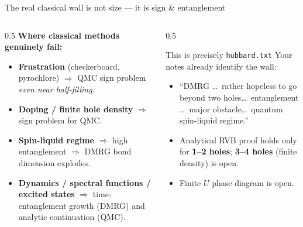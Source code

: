 \documentclass[aspectratio=169,11pt]{beamer}
\begin{document}
\begin{frame}{The real classical wall is not size --- it is sign \& entanglement}
\begin{columns}[T]
\begin{column}{0.5\textwidth}
\textbf{Where classical methods genuinely fail:}
\begin{itemize}
  \item \textbf{Frustration} (checkerboard, pyrochlore)
        $\Rightarrow$ QMC sign problem \emph{even near half-filling}.
  \item \textbf{Doping / finite hole density}
        $\Rightarrow$ sign problem for QMC.
  \item \textbf{Spin-liquid regime} $\Rightarrow$ high entanglement
        $\Rightarrow$ DMRG bond dimension explodes.
  \item \textbf{Dynamics / spectral functions / excited states}
        $\Rightarrow$ time-entanglement growth (DMRG) and analytic
        continuation (QMC).
\end{itemize}
\end{column}
\begin{column}{0.5\textwidth}
\begin{block}{This is precisely \texttt{hubbard.txt}}
Your notes already identify the wall:
\begin{itemize}\small
  \item ``DMRG \dots\ rather hopeless to go beyond two holes\dots\
        entanglement \dots\ major obstacle\dots\ quantum spin-liquid regime.''
  \item Analytical RVB proof holds only for \textbf{1--2 holes};
        \textbf{3--4 holes} (finite density) is open.
  \item Finite $U$ phase diagram is open.
\end{itemize}
\end{block}
\end{column}
\end{columns}
\end{frame}
\end{document}
